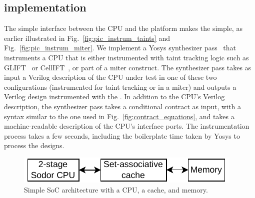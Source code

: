\subsection{\PICI implementation}
\label{subsec:pici_impl}

The simple interface between the CPU and the platform makes the \PICIs simple, as earlier illustrated in Fig.~\ref{fig:pic_instrum_taints} and Fig.~\ref{fig:pic_instrum_miter}.
We implement a Yosys synthesizer pass~\cite{wolf2013yosys} that instruments a CPU that is either instrumented with taint tracking logic such as GLIFT~\cite{tiwari2009complete} or CellIFT~\cite{solt2022cellift}, or part of a miter construct.
The synthesizer pass takes as input a Verilog description of the CPU under test in one of these two configurations (instrumented for taint tracking or in a miter) and outputs a Verilog design instrumented with the \PICI.
In addition to the CPU's Verilog description, the synthesizer pass takes a conditional contract as input, with a syntax similar to the one used in Fig.~\ref{fig:contract_equations}, and takes a machine-readable description of the CPU's interface ports.
The instrumentation process takes a few seconds, including the boilerplate time taken by Yosys to process the designs.

\begin{figure}[t]
    \begin{center}
    \includegraphics[width=0.80\columnwidth]{figures/simple_soc/simple_soc.pdf}
    \end{center}
    \vspace*{-1.2em}
    \caption{\label{fig:simple_soc} Simple SoC architecture with a CPU, a cache, and memory.}
    \vspace*{-1.4em}
\end{figure}

